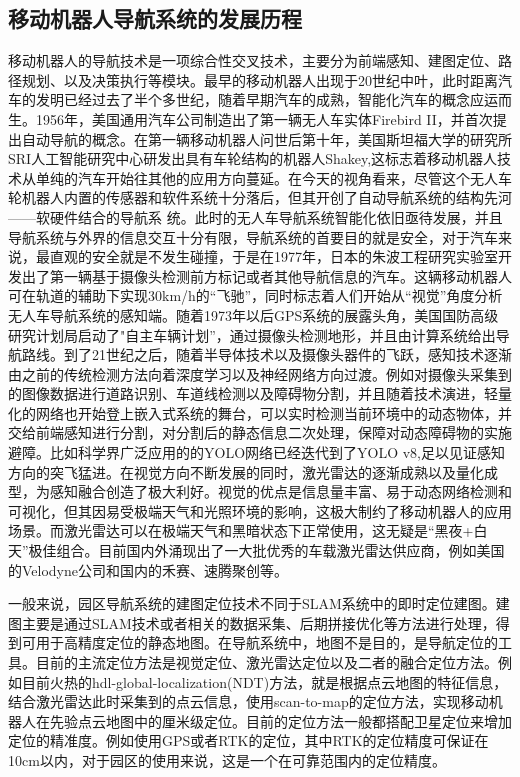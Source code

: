 \subsection{移动机器人导航系统的发展历程}
移动机器人的导航技术是一项综合性交叉技术，主要分为前端感知、建图定位、路径规划、以及决策执行等模块。最早的移动机器人出现于20世纪中叶，此时距离汽车的发明已经过去了半个多世纪，随着早期汽车的成熟，智能化汽车的概念应运而生。1956年，美国通用汽车公司制造出了第一辆无人车实体Firebird II，并首次提出自动导航的概念。在第一辆移动机器人问世后第十年，美国斯坦福大学的研究所SRI人工智能研究中心研发出具有车轮结构的机器人Shakey,这标志着移动机器人技术从单纯的汽车开始往其他的应用方向蔓延。在今天的视角看来，尽管这个无人车轮机器人内置的传感器和软件系统十分落后，但其开创了自动导航系统的结构先河——软硬件结合的导航系
统。此时的无人车导航系统智能化依旧亟待发展，并且导航系统与外界的信息交互十分有限，导航系统的首要目的就是安全，对于汽车来说，最直观的安全就是不发生碰撞，于是在1977年，日本的朱波工程研究实验室开发出了第一辆基于摄像头检测前方标记或者其他导航信息的汽车。这辆移动机器人可在轨道的辅助下实现30km/h的“飞驰”，同时标志着人们开始从“视觉”角度分析无人车导航系统的感知端。随着1973年以后GPS系统的展露头角，美国国防高级研究计划局启动了"自主车辆计划”，通过摄像头检测地形，并且由计算系统给出导航路线。到了21世纪之后，随着半导体技术以及摄像头器件的飞跃，感知技术逐渐由之前的传统检测方法向着深度学习以及神经网络方向过渡。例如对摄像头采集到的图像数据进行道路识别、车道线检测以及障碍物分割，并且随着技术演进，轻量化的网络也开始登上嵌入式系统的舞台，可以实时检测当前环境中的动态物体，并交给前端感知进行分割，对分割后的静态信息二次处理，保障对动态障碍物的实施避障。比如科学界广泛应用的的YOLO网络已经迭代到了YOLO v8,足以见证感知方向的突飞猛进。在视觉方向不断发展的同时，激光雷达的逐渐成熟以及量化成型，为感知融合创造了极大利好。视觉的优点是信息量丰富、易于动态网络检测和可视化，但其因易受极端天气和光照环境的影响，这极大制约了移动机器人的应用场景。而激光雷达可以在极端天气和黑暗状态下正常使用，这无疑是“黑夜+白天”极佳组合。目前国内外涌现出了一大批优秀的车载激光雷达供应商，例如美国的Velodyne公司和国内的禾赛、速腾聚创等。

一般来说，园区导航系统的建图定位技术不同于SLAM系统中的即时定位建图。建图主要是通过SLAM技术或者相关的数据采集、后期拼接优化等方法进行处理，得到可用于高精度定位的静态地图。在导航系统中，地图不是目的，是导航定位的工具。目前的主流定位方法是视觉定位、激光雷达定位以及二者的融合定位方法。例如目前火热的hdl-global-localization(NDT)方法，就是根据点云地图的特征信息，结合激光雷达此时采集到的点云信息，使用scan-to-map的定位方法，实现移动机器人在先验点云地图中的厘米级定位。目前的定位方法一般都搭配卫星定位来增加定位的精准度。例如使用GPS或者RTK的定位，其中RTK的定位精度可保证在10cm以内，对于园区的使用来说，这是一个在可靠范围内的定位精度。


